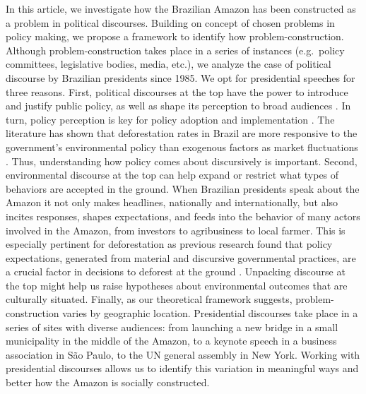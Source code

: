 \documentclass[]{interact}
\theoremstyle{plain}%
\theoremstyle{definition}
\theoremstyle{remark}
\begin{document}
In this article, we investigate how the Brazilian Amazon has been
constructed as a problem in political discourses. Building on
\citet{hirschman1963} concept of chosen problems in policy making, we
propose a framework to identify how problem-construction. Although
problem-construction takes place in a series of instances (e.g.~policy
committees, legislative bodies, media, etc.), we analyze the case of
political discourse by Brazilian presidents since 1985. We opt for
presidential speeches for three reasons. First, political discourses at
the top have the power to introduce and justify public policy, as well
as shape its perception to broad audiences \citep{zarefsky2004}. In
turn, policy perception is key for policy adoption and implementation
\citep{alesina2009, lopez2020}. The literature has shown that
deforestation rates in Brazil are more responsive to the government's
environmental policy than exogenous factors as market fluctuations
\citep{assuncao2015, capobianco2019, capobianco2021}. Thus,
understanding how policy comes about discursively is important. Second,
environmental discourse at the top can help expand or restrict what
types of behaviors are accepted in the ground. When Brazilian presidents
speak about the Amazon it not only makes headlines, nationally and
internationally\citep{brice2021, harris2021, miranda2021}, but also
incites responses, shapes expectations, and feeds into the behavior of
many actors involved in the Amazon, from investors to agribusiness to
local farmer. This is especially pertinent for deforestation as previous
research found that policy expectations, generated from material and
discursive governmental practices, are a crucial factor in decisions to
deforest at the ground \citep{capobianco2019, campbell2015}. Unpacking
discourse at the top might help us raise hypotheses about environmental
outcomes that are culturally situated. Finally, as our theoretical
framework suggests, problem-construction varies by geographic location.
Presidential discourses take place in a series of sites with diverse
audiences: from launching a new bridge in a small municipality in the
middle of the Amazon, to a keynote speech in a business association in
São Paulo, to the UN general assembly in New York. Working with
presidential discourses allows us to identify this variation in
meaningful ways and better how the Amazon is socially constructed.
\end{document}
